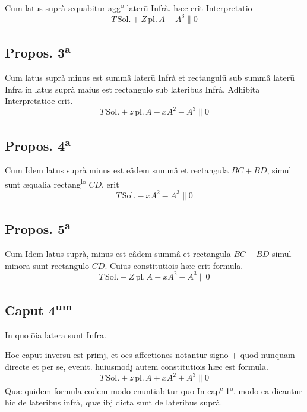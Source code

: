 \documentclass[11pt,a4paper]{article}
\begin{document}
Cum latus suprà æquabitur agg\textsuperscript{o} laterū Infrà. hæc erit Interpretatio
\[ T\,\mathrm{Sol.} + Z\,\mathrm{pl.}\,A - A^{3} \parallel 0 \]

\subsection*{Propos. 3\textsuperscript{a}}

Cum latus suprà minus est summâ laterū Infrà et rectangulū sub summâ laterū Infra in latus suprà maius est rectangulo sub lateribus Infrà. Adhibita Interpretatiōe erit.
\[ T\,\mathrm{Sol.} + z\,\mathrm{pl.}\,A - xA^{2} - A^{3} \parallel 0 \]

\subsection*{Propos. 4\textsuperscript{a}}

Cum Idem latus suprà minus est eâdem summâ et rectangula $BC + BD$, simul sunt æqualia rectang\textsuperscript{lo} $CD$. erit
\[ T\,\mathrm{Sol.} - xA^{2} - A^{3} \parallel 0 \]

\subsection*{Propos. 5\textsuperscript{a}}

Cum Idem latus suprà, minus est eâdem summâ et rectangula $BC + BD$ simul minora sunt rectangulo $CD$. Cuius constitutiōis hæc erit formula.
\[ T\,\mathrm{Sol.} - Z\,\mathrm{pl.}\,A - xA^{2} - A^{3} \parallel 0 \]

\subsection*{Caput 4\textsuperscript{um}}

In quo ōia latera sunt Infra.

Hoc caput inversū est primj, et ōes affectiones notantur signo $+$ quod nunquam directe et per se, evenit. huiusmodj autem constitutiōis hæc est formula.
\[ T\,\mathrm{Sol.} + z\,\mathrm{pl.}\,A + xA^{2} + A^{3} \parallel 0 \]
Quæ quidem formula eodem modo enuntiabitur quo In cap\textsuperscript{e} 1\textsuperscript{o}. modo ea dicantur hic de lateribus infrà, quæ ibj dicta sunt de lateribus suprà.
\end{document}

